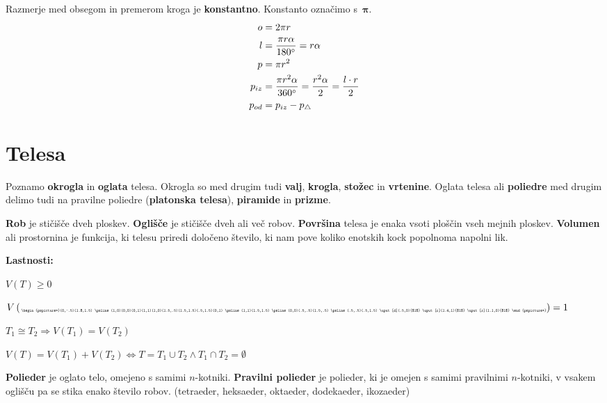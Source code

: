 \documentclass[a4paper,oneside,12pt,fleqn]{article}
\newcommand\krat\cdot
\def\deg{\degree}
\renewcommand\implies\Rightarrow
\renewcommand\iff\Leftrightarrow
\numberwithin{equation}{section}
\newenvironment{itemize*}%
{
\vspace{-12pt}%
\begin{itemize}%
\setlength{\itemsep}{0pt}%
\setlength{\parskip}{2pt}}%
{\end{itemize}}
\begin{document}
Razmerje med obsegom in premerom kroga je \textbf{konstantno}. Konstanto označimo s~$\boldsymbol\pi$.
\begin{align*}
  o &= 2\pi r \\
  l &= \frac{\pi r\alpha}{180\deg} = r\alpha \\
  p &= \pi r^2 \\
  p_{iz} &= \frac{\pi r^2\alpha}{360\deg} = \frac{r^2\alpha}{2} = \frac{l\krat
  r}{2} \\
  p_{od} &= p_{iz} - p_{\triangle}
\end{align*}

\section{Telesa}
\label{sec:tel}
Poznamo \textbf{okrogla} in \textbf{oglata} telesa. Okrogla so med drugim tudi
\textbf{valj}, \textbf{krogla}, \textbf{stožec} in
\textbf{vrtenine}. Oglata telesa ali \textbf{poliedre} med drugim delimo tudi na pravilne poliedre
(\textbf{platonska telesa}), \textbf{piramide} in \textbf{prizme}.

\textbf{Rob} je stičišče dveh ploskev. \textbf{Oglišče} je stičišče dveh ali več robov.
\textbf{Površina} telesa je enaka vsoti ploščin vseh mejnih ploskev. 
\textbf{Volumen} ali prostornina je funkcija, ki telesu
priredi določeno število, ki nam pove koliko enotskih kock popolnoma napolni lik.

\textbf{Lastnosti:}
\begin{itemize*}
  \item $V(T) \ge 0$
  \item $V\left(
    \raisebox{-.4\height}{\scalebox{0.4}{
    \begin{pspicture*}(0,-.5)(1.8,1.5)
      \psline(1,0)(0,0)(0,1)(1,1)(1,0)(1.5,.5)(1.5,1.5)(.5,1.5)(0,1)
      \psline(1,1)(1.5,1.5)
      \psline(0,0)(.5,.5)(1.5,.5)
      \psline(.5,.5)(.5,1.5)
      \uput[d](.5,0){$1$}
      \uput[r](1.4,1){$1$}
      \uput[r](1.1,0){$1$}
    \end{pspicture*}}}\right) = 1$
  \item $T_1 \cong T_2 \implies V(T_1) = V(T_2)$
  \item $V(T) = V(T_1) + V(T_2) \iff T = T_1 \cup T_2 \land T_1 \cap T_2 = \emptyset$
\end{itemize*}

\textbf{Polieder} je oglato telo, omejeno s samimi $n$-kotniki.
\textbf{Pravilni polieder} je polieder, ki je omejen s samimi pravilnimi $n$-kotniki, v vsakem
oglišču pa se stika enako število robov. (tetraeder, heksaeder, oktaeder, dodekaeder,
ikozaeder)
\end{document}
